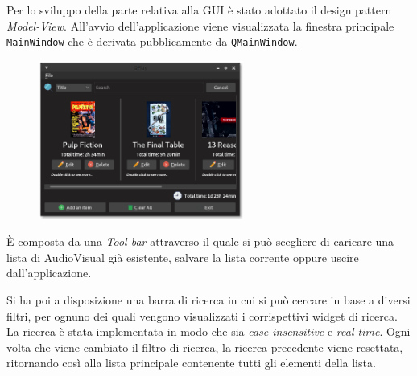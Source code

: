 Per lo sviluppo della parte relativa alla GUI è stato adottato il design pattern \textit{Model-View}. \newline
All'avvio dell'applicazione viene visualizzata la finestra principale \texttt{MainWindow} che è derivata pubblicamente da \texttt{QMainWindow}. \newline
\begin{figure}
    \includegraphics[width=0.6\textwidth]{img/main} 
\end{figure}
È composta da una \textit{Tool bar} attraverso il quale si può scegliere di caricare una lista di AudioVisual già esistente, salvare la lista corrente oppure uscire dall'applicazione. \newline

Si ha poi a disposizione una barra di ricerca in cui si può cercare in base a diversi filtri, per ognuno dei quali vengono visualizzati i corrispettivi widget di ricerca. La ricerca è stata implementata in modo che sia \textit{case insensitive} e \textit{real time}. \newline
Ogni volta che viene cambiato il filtro di ricerca, la ricerca precedente viene resettata, ritornando così alla lista principale contenente tutti gli elementi della lista. \newline


